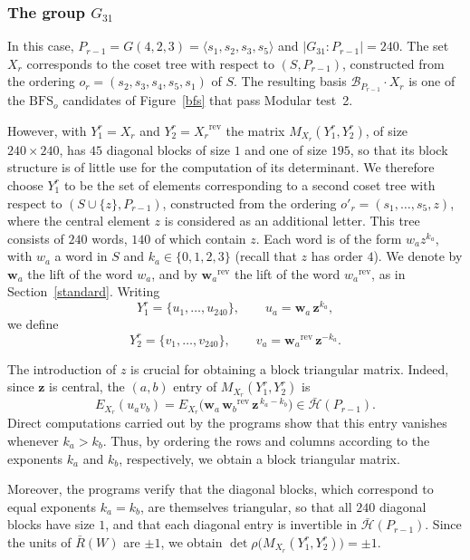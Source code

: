 \documentclass[11pt, reqno]{amsart}
\newcommand{\cB}{\mathcal{B}}
\newcommand{\cH}{\mathcal{H}}
\newcommand{\BFS}{\mathrm{BFS}}
\newcommand{\wrev}[1]{{#1}^{\mathrm{rev}}}
\numberwithin{equation}{section}
\theoremstyle{remark}
\begin{document}
\subsubsection{The group $G_{31}$}\label{g31}
In this case, $P_{r-1}=G(4,2,3)=\langle s_1,s_2,s_3,s_5\rangle$ and $|G_{31}:P_{r-1}|=240$. The set $X_r$ corresponds to the coset tree with respect to $(S,P_{r-1})$, constructed from the ordering $o_r=(s_2,s_3,s_4,s_5,s_1)$ of $S$. The resulting basis $\cB_{P_{r-1}}\cdot X_r$ is one of the $\BFS_o$ candidates of Figure~\ref{bfs} that pass Modular test~2. 

However, with $Y^r_1=X_r$ and $Y^r_2=\wrev{X_r}$ the matrix $M_{X_r}(Y^r_1,Y^r_2)$, of size $240\times240$, has $45$ diagonal blocks of size $1$ and one of size $195$, so that its block structure is of little use for the computation of its determinant.
 We therefore choose $Y^r_1$ to be the set of elements corresponding to a second coset tree with respect to $(S\cup\{z\},P_{r-1})$, constructed from the ordering $o'_r=(s_1,\dots,s_5,z)$, where the central element $z$ is considered as an additional letter. This tree consists of $240$ words, $140$ of which contain $z$. Each word is of the form $w_az^{k_a}$, with $w_a$ a word in $S$ and $k_a\in\{0,1,2,3\}$ (recall that $z$ has order $4$). We denote by $\mathbf w_a$ the lift of the word $w_a$, and by $\wrev{\mathbf w_a}$ the lift of the word $\wrev{w_a}$, as in Section~\ref{standard}. Writing
\[
Y^r_1=\{u_1,\dots,u_{240}\},\qquad u_a=\mathbf w_a\,\mathbf z^{k_a},
\]
we define
\[
Y^r_2=\{v_1,\dots,v_{240}\},\qquad v_a=\wrev{\mathbf w_a}\,\mathbf z^{-k_a}.
\]

The introduction of $z$ is crucial for obtaining a block triangular matrix. Indeed, since $\mathbf z$ is central, the $(a,b)$ entry of $M_{X_r}(Y^r_1,Y^r_2)$ is
\[
E_{X_r}(u_av_b)=E_{X_r}\bigl(\mathbf w_a\,\wrev{\mathbf w_b}\,\mathbf z^{\,k_a-k_b}\bigr)\in\bar{\cH}(P_{r-1}).
\]
Direct computations carried out by the programs show that this entry vanishes whenever $k_a>k_b$. Thus, by ordering the rows and columns according to the exponents $k_a$ and $k_b$, respectively, we obtain a block triangular matrix.

Moreover, the programs verify that the diagonal blocks, which correspond to equal exponents $k_a=k_b$, are themselves triangular, so that all $240$ diagonal blocks have size $1$, and that each diagonal entry is invertible in $\bar{\cH}(P_{r-1})$.  Since the units of $\bar R(W)$ are $\pm1$, we obtain $\det\rho\bigl(M_{X_r}(Y^r_1,Y^r_2)\bigr)=\pm1$.
\end{document}
